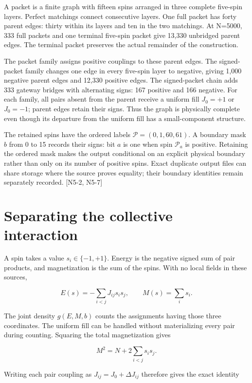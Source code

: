 A packet is a finite graph with fifteen spins arranged in three complete five-spin layers. Perfect matchings connect consecutive layers. One full packet has forty parent edges: thirty within its layers and ten in the two matchings. At N=5000, 333 full packets and one terminal five-spin packet give 13,330 unbridged parent edges. The terminal packet preserves the actual remainder of the construction.

The packet family assigns positive couplings to these parent edges. The signed-packet family changes one edge in every five-spin layer to negative, giving 1,000 negative parent edges and 12,330 positive edges. The signed-packet chain adds 333 gateway bridges with alternating signs: 167 positive and 166 negative. For each family, all pairs absent from the parent receive a uniform fill \(J_0=+1\) or \(J_0=-1\); parent edges retain their signs. Thus the graph is physically complete even though its departure from the uniform fill has a small-component structure.

The retained spins have the ordered labels \(\mathcal P=(0,1,60,61)\). A boundary mask \(b\) from 0 to 15 records their signs: bit \(a\) is one when spin \(\mathcal P_a\) is positive. Retaining the ordered mask makes the output conditional on an explicit physical boundary rather than only on its number of positive spins. Exact duplicate output files can share storage where the source proves equality; their boundary identities remain separately recorded. {[}N5-2, N5-7{]}

\section{Separating the collective interaction}\label{separating-the-collective-interaction}

A spin takes a value \(s_i\in\{-1,+1\}\). Energy is the negative signed sum of pair products, and magnetization is the sum of the spins. With no local fields in these sources,

\[\displaystyle E(s)=-\sum_{i<j}J_{ij}s_i s_j,\qquad M(s)=\sum_i s_i.\]

The joint density \(g(E,M,b)\) counts the assignments having those three coordinates. The uniform fill can be handled without materializing every pair during counting. Squaring the total magnetization gives

\[M^2=N+2\sum_{i<j}s_i s_j.\]

Writing each pair coupling as \(J_{ij}=J_0+\Delta J_{ij}\) therefore gives the exact identity


